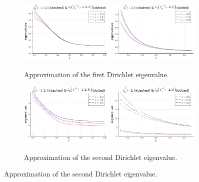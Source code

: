 \begin{figure}
    \centering
    \begin{subfigure}{\linewidth}
    \includegraphics[width=0.49\textwidth]{figures/03/2d/lambda/l1_xi1_beta=2.0.pdf}
    \includegraphics[width=0.49\textwidth]{figures/03/2d/lambda/l1_xi2_beta=2.0.pdf}
    \caption[]{Approximation of the first Dirichlet eigenvalue.}
    \end{subfigure}
\begin{subfigure}{\linewidth}
    \includegraphics[width=0.49\textwidth]{figures/03/2d/lambda/l2_xi1_beta=2.0.pdf}
    \includegraphics[width=0.49\textwidth]{figures/03/2d/lambda/l2_xi2_beta=2.0.pdf}
    \caption[]{Approximation of the second Dirichlet eigenvalue.}
\end{subfigure}

\end{figure}
